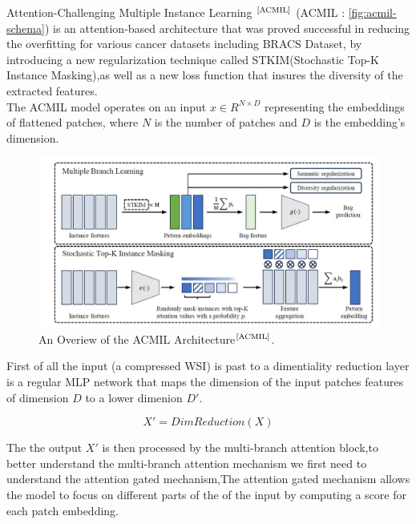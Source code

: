\documentclass[
11pt, %
english, %
singlespacing, %
headsepline, %
]{project_structure}
\newcommand{\subpar}[1]{\paragraph*{#1}}
\begin{document}
\noindent Attention-Challenging Multiple Instance Learning $^{\text{\cite{ACMIL}}}$ (\acrshort{ACMIL} : \autoref{fig:acmil-schema}) is an attention-based architecture that was proved successful in reducing the overfitting for various cancer datasets including \acrshort{BRACS} Dataset, by introducing a new regularization technique called \acrshort{STKIM}(Stochastic Top-K Instance Masking),as well as a new loss function that insures the diversity of the extracted features.\\

\noindent The \acrshort{ACMIL} model operates on an input $x \in R^{N \times D}$ representing the embeddings of flattened patches, where $N$ is the number of patches and $D$ is the embedding's dimension.

\begin{figure}[H]
    \centering
    \includegraphics[width=\textwidth]{figures/ABNN_methods/acmil.jpg}
    \caption{An Overiew of the \acrshort{ACMIL} Architecture$^{\text{\cite{ACMIL}}}$.}
    \label{fig:acmil-schema}
\end{figure}


\newpage
\noindent First of all the input (a compressed WSI) is past to a dimentiality reduction layer is a regular \acrshort{MLP} network that maps the dimension of the input patches features of dimension $D$ to a lower dimenion $D'$.

$$
X' = DimReduction(X)
$$

\noindent The the output $X'$ is then processed by the multi-branch attention block,to better understand the multi-branch attention mechanism we first need to understand the attention gated mechanism,The attention gated mechanism allows the model to focus on different parts of the of the input by computing a score for each patch embedding.\\
\end{document}
